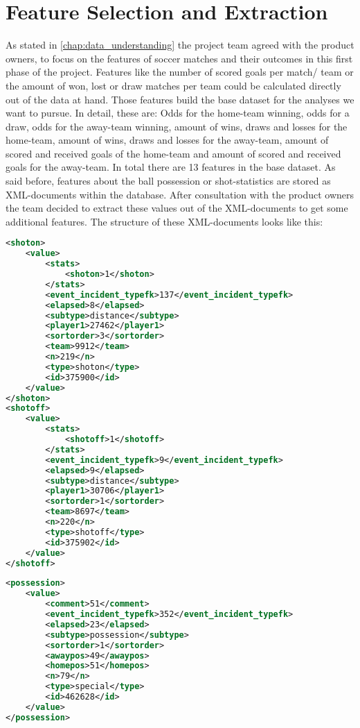 
\chapter{Feature Selection and Extraction}
\label{chap:feature_selection_and_extraction}
As stated in \autoref{chap:data_understanding} the project team agreed with the product owners, to focus on the features of soccer matches and their outcomes in this first phase of the project. Features like the number of scored goals per match/ team or the amount of won, lost or draw matches per team could be calculated directly out of the data at hand. Those features build the base dataset for the analyses we want to pursue. In detail, these are: Odds for the home-team winning, odds for a draw, odds for the away-team winning, amount of wins, draws and losses for the home-team, amount of wins, draws and losses for the away-team, amount of scored and received goals of the home-team and amount of scored and received goals for the away-team. In total there are 13 features in the base dataset.
\newline
As said before, features about the ball possession or shot-statistics are stored as XML-documents within the database. After consultation with the product owners the team decided to extract these values out of the XML-documents to get some additional features. The structure of these XML-documents looks like this:
\\
\begin{lstlisting}[language=XML, caption=XML structure of shot-statistics]
<shoton>
	<value>
		<stats>
			<shoton>1</shoton>
		</stats>
		<event_incident_typefk>137</event_incident_typefk>
		<elapsed>8</elapsed>
		<subtype>distance</subtype>
		<player1>27462</player1>
		<sortorder>3</sortorder>
		<team>9912</team>
		<n>219</n>
		<type>shoton</type>
		<id>375900</id>
	</value>
</shoton>
<shotoff>
	<value>
		<stats>
			<shotoff>1</shotoff>
		</stats>
		<event_incident_typefk>9</event_incident_typefk>
		<elapsed>9</elapsed>
		<subtype>distance</subtype>
		<player1>30706</player1>
		<sortorder>1</sortorder>
		<team>8697</team>
		<n>220</n>
		<type>shotoff</type>
		<id>375902</id>
	</value>
</shotoff>
\end{lstlisting}

\begin{lstlisting}[language=XML, caption=XML structure of ball-possession-statistics]
<possession>
	<value>
		<comment>51</comment>
		<event_incident_typefk>352</event_incident_typefk>
		<elapsed>23</elapsed>
		<subtype>possession</subtype>
		<sortorder>1</sortorder>
		<awaypos>49</awaypos>
		<homepos>51</homepos>
		<n>79</n>
		<type>special</type>
		<id>462628</id>
	</value>
</possession>
\end{lstlisting}

